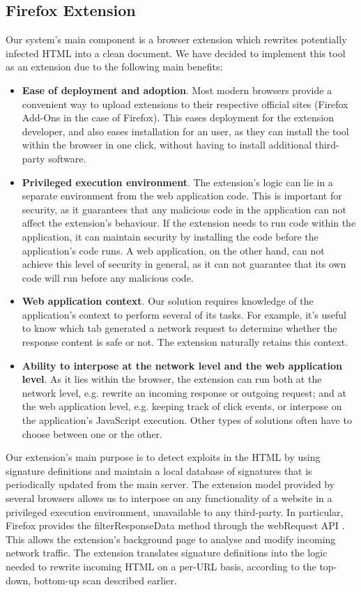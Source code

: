  \subsection{Firefox Extension}
 Our system's main component is a browser extension which rewrites potentially infected HTML into a clean document.
 We have decided to implement this tool as an extension due to the following main benefits:
 \begin{itemize}
 	\item \textbf{Ease of deployment and adoption}. Most modern browsers provide a convenient way to upload extensions to their respective official sites (Firefox Add-Ons in the case of Firefox). This eases deployment for the extension developer, and also eases installation for an user, as they can install the tool within the browser in one click, without having to install additional third-party software.
 	\item \textbf{Privileged execution environment}. The extension's logic can lie in a separate environment from the web application code. This is important for security, as it guarantees that any malicious code in the application can not affect the extension's behaviour. If the extension needs to run code within the application, it can maintain security by installing the code before the application's code runs. A web application, on the other hand, can not achieve this level of security in general, as it can not guarantee that its own code will run before any malicious code.
 	\item \textbf{Web application context}. Our solution requires knowledge of the application's context to perform several of its tasks. For example, it's useful to know which tab generated a network request to determine whether the response content is safe or not. The extension naturally retains this context.
 	\item \textbf{Ability to interpose at the network level and the web application level}. As it lies within the browser, the extension can run both at the network level, e.g. rewrite an incoming response or outgoing request; and at the web application level, e.g. keeping track of click events, or interpose on the application's JavaScript execution. Other types of solutions often have to choose between one or the other.
 \end{itemize}

Our extension's main purpose is to detect exploits in the HTML by using signature definitions and maintain a local database of signatures that is periodically updated from the main server.
The extension model provided by several browsers allows us to interpose on any functionality of a website in a privileged execution environment, unavailable to any third-party. In particular, Firefox provides the filterResponseData method through the webRequest API \cite{webRequest} . This allows the extension's background page to analyse and modify incoming network traffic. The extension translates signature definitions into the logic needed to rewrite incoming HTML on a per-URL basis, according to the top-down, bottom-up scan described earlier. 

